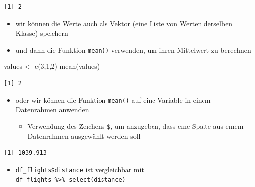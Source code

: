 \documentclass[
  letterpaper,
  DIV=11]{scrartcl}
\newenvironment{Shaded}{\begin{snugshade}}{\end{snugshade}}
\newcommand{\DecValTok}[1]{\textcolor[rgb]{0.68,0.00,0.00}{#1}}
\newcommand{\FunctionTok}[1]{\textcolor[rgb]{0.28,0.35,0.67}{#1}}
\newcommand{\NormalTok}[1]{\textcolor[rgb]{0.00,0.23,0.31}{#1}}
\newcommand{\OtherTok}[1]{\textcolor[rgb]{0.00,0.23,0.31}{#1}}
\newcommand{\SpecialCharTok}[1]{\textcolor[rgb]{0.37,0.37,0.37}{#1}}
\providecommand{\tightlist}{%
  \setlength{\itemsep}{0pt}\setlength{\parskip}{0pt}}\usepackage{longtable,booktabs,array}
\begin{document}
\begin{verbatim}
[1] 2
\end{verbatim}

\begin{itemize}
\tightlist
\item
  wir können die Werte auch als Vektor (eine Liste von Werten derselben
  Klasse) speichern
\item
  und dann die Funktion \texttt{mean()} verwenden, um ihren Mittelwert
  zu berechnen
\end{itemize}

\begin{Shaded}
\begin{Highlighting}[]
\NormalTok{values }\OtherTok{\textless{}{-}} \FunctionTok{c}\NormalTok{(}\DecValTok{3}\NormalTok{,}\DecValTok{1}\NormalTok{,}\DecValTok{2}\NormalTok{)}
\FunctionTok{mean}\NormalTok{(values)}
\end{Highlighting}
\end{Shaded}

\begin{verbatim}
[1] 2
\end{verbatim}

\begin{itemize}
\tightlist
\item
  oder wir können die Funktion \texttt{mean()} auf eine Variable in
  einem Datenrahmen anwenden

  \begin{itemize}
  \tightlist
  \item
    Verwendung des Zeichens \texttt{\$}, um anzugeben, dass eine Spalte
    aus einem Datenrahmen ausgewählt werden soll
  \end{itemize}
\end{itemize}

\begin{Shaded}
\end{Shaded}

\begin{verbatim}
[1] 1039.913
\end{verbatim}

\begin{itemize}
\tightlist
\item
  \texttt{df\_flights\$distance} ist vergleichbar mit
  \texttt{df\_flights\ \%\textgreater{}\%\ select(distance)}
\end{itemize}
\end{document}
